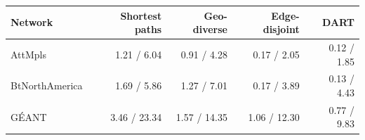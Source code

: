 \begin{tabular}{lrrrr}
\toprule
Network & Shortest paths & Geo-diverse & Edge-disjoint & DART \\
\midrule
AttMpls & 1.21 / 6.04 & 0.91 / 4.28 & 0.17 / 2.05 & 0.12 / 1.85 \\
BtNorthAmerica & 1.69 / 5.86 & 1.27 / 7.01 & 0.17 / 3.89 & 0.13 / 4.43 \\
G\'EANT & 3.46 / 23.34 & 1.57 / 14.35 & 1.06 / 12.30 & 0.77 / 9.83 \\
\bottomrule
\end{tabular}
